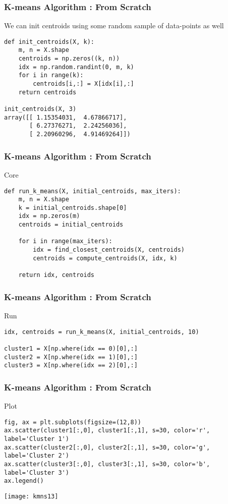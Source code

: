 \begin{frame}[fragile]\frametitle{K-means Algorithm : From Scratch}
We can init centroids using some random sample of data-points as well
\begin{lstlisting}
def init_centroids(X, k):
    m, n = X.shape
    centroids = np.zeros((k, n))
    idx = np.random.randint(0, m, k)
    for i in range(k):
        centroids[i,:] = X[idx[i],:]
    return centroids
    
init_centroids(X, 3)
array([[ 1.15354031,  4.67866717],
       [ 6.27376271,  2.24256036],
       [ 2.20960296,  4.91469264]])
\end{lstlisting}
\end{frame}



\begin{frame}[fragile]\frametitle{K-means Algorithm : From Scratch}
Core
\begin{lstlisting}
def run_k_means(X, initial_centroids, max_iters):
    m, n = X.shape
    k = initial_centroids.shape[0]
    idx = np.zeros(m)
    centroids = initial_centroids
    
    for i in range(max_iters):
        idx = find_closest_centroids(X, centroids)
        centroids = compute_centroids(X, idx, k)
    
    return idx, centroids
\end{lstlisting}
\end{frame}

\begin{frame}[fragile]\frametitle{K-means Algorithm : From Scratch}
Run
\begin{lstlisting}
idx, centroids = run_k_means(X, initial_centroids, 10)

cluster1 = X[np.where(idx == 0)[0],:]
cluster2 = X[np.where(idx == 1)[0],:]
cluster3 = X[np.where(idx == 2)[0],:]
\end{lstlisting}
\end{frame}

\begin{frame}[fragile]\frametitle{K-means Algorithm : From Scratch}
Plot
\begin{lstlisting}
fig, ax = plt.subplots(figsize=(12,8))
ax.scatter(cluster1[:,0], cluster1[:,1], s=30, color='r', label='Cluster 1')
ax.scatter(cluster2[:,0], cluster2[:,1], s=30, color='g', label='Cluster 2')
ax.scatter(cluster3[:,0], cluster3[:,1], s=30, color='b', label='Cluster 3')
ax.legend()
\end{lstlisting}
\begin{center}
\texttt{[image: kmns13]}
\end{center}
\end{frame}



